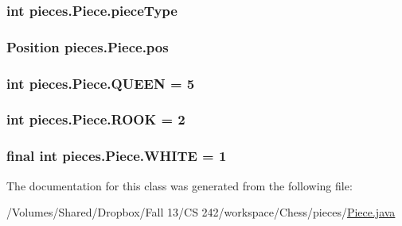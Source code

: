 \hypertarget{classpieces_1_1_piece_ae40d6201d0aed36f369dd9d8f55892e3}{
\subsubsection[{piece\-Type}]{\setlength{\rightskip}{0pt plus 5cm}int pieces.\-Piece.\-piece\-Type\hspace{0.3cm}{\ttfamily [protected]}}}\label{classpieces_1_1_piece_ae40d6201d0aed36f369dd9d8f55892e3}
\hypertarget{classpieces_1_1_piece_a9a3b5cf20c198c74a04cea615815b11c}{
\subsubsection[{pos}]{\setlength{\rightskip}{0pt plus 5cm}Position pieces.\-Piece.\-pos\hspace{0.3cm}{\ttfamily [protected]}}}\label{classpieces_1_1_piece_a9a3b5cf20c198c74a04cea615815b11c}
\hypertarget{classpieces_1_1_piece_a6bf04fb81c4004dbdf7ffe388d0d5709}{
\subsubsection[{Q\-U\-E\-E\-N}]{\setlength{\rightskip}{0pt plus 5cm}int pieces.\-Piece.\-Q\-U\-E\-E\-N = 5\hspace{0.3cm}{\ttfamily [static]}}}\label{classpieces_1_1_piece_a6bf04fb81c4004dbdf7ffe388d0d5709}
\hypertarget{classpieces_1_1_piece_abd3221f0cd505d49ca331c79264cb16f}{
\subsubsection[{R\-O\-O\-K}]{\setlength{\rightskip}{0pt plus 5cm}int pieces.\-Piece.\-R\-O\-O\-K = 2\hspace{0.3cm}{\ttfamily [static]}}}\label{classpieces_1_1_piece_abd3221f0cd505d49ca331c79264cb16f}
\hypertarget{classpieces_1_1_piece_a06ca63ba013da56fa10ccde66da622c7}{
\subsubsection[{W\-H\-I\-T\-E}]{\setlength{\rightskip}{0pt plus 5cm}final int pieces.\-Piece.\-W\-H\-I\-T\-E = 1\hspace{0.3cm}{\ttfamily [static]}}}\label{classpieces_1_1_piece_a06ca63ba013da56fa10ccde66da622c7}


The documentation for this class was generated from the following file\-:\begin{DoxyCompactItemize}
\item 
/\-Volumes/\-Shared/\-Dropbox/\-Fall 13/\-C\-S 242/workspace/\-Chess/pieces/\hyperlink{_piece_8java}{Piece.\-java}\end{DoxyCompactItemize}
